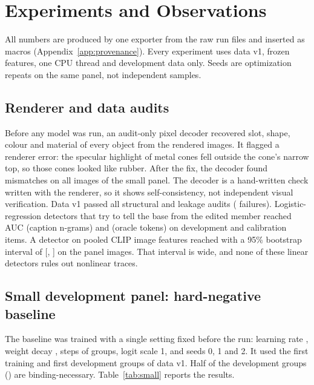 \section{Experiments and Observations}
\label{sec:experiments}

All numbers are produced by one exporter from the raw run files and inserted as macros
(Appendix~\ref{app:provenance}). Every experiment uses data v1, frozen features, one CPU thread and
development data only. Seeds are optimization repeats on the same panel, not independent samples.

\subsection{Renderer and data audits}
Before any model was run, an audit-only pixel decoder recovered slot, shape, colour and material of
every object from the rendered images. It flagged a renderer error: the specular highlight of metal
cones fell outside the cone's narrow top, so those cones looked like rubber. After the fix, the
decoder found \SPrenderMismatch{} mismatches on all \SPrenderImages{} images of the small panel.
The decoder is a hand-written check written with the renderer, so it shows self-consistency, not
independent visual verification. Data v1 passed all structural and leakage audits (\DVauditFail{}
failures). Logistic-regression detectors that try to tell the base from the edited member reached
AUC \DVblindText{} (caption n-grams) and \DVblindImage{} (oracle tokens) on \DVblindN{}
development and calibration items. A detector on pooled CLIP image features reached
\SPdetectAUC{} with a 95\% bootstrap interval of [\SPdetectLo, \SPdetectHi] on the \SPdetectN{} panel images.
That interval is wide, and none of these linear detectors rules out nonlinear traces.

\subsection{Small development panel: hard-negative baseline}
The baseline was trained with a single setting fixed before the run: learning rate \SPlr, weight
decay \SPwd, \SPsteps{} steps of \SPbatch{} groups, logit scale 1, and seeds 0, 1 and 2. It used the first
\SPtrainGroups{} training and first \SPdevGroups{} development groups of data v1. Half of the
development groups (\SPdevBNn) are binding-necessary. Table~\ref{tab:small} reports the results.

\begin{table}[t]
\caption{Small development panel (\SPtrainGroups{} training / \SPdevGroups{} development groups,
\SPdevBNn{} binding-necessary). Entries for trained heads list seeds 0/1/2, which are optimization
repeats on the same panel. \bn: binding-necessary subset; ``all'': all four edit kinds. Chance for
independent continuous scores: group $1/6$, GroupMatch $1/2$, pair AUC $0.5$. Single-modality rows
are zero or $0.5$ by construction (Section~\ref{sec:setting}). Source:
\url{runs/pixel_baseline_v1_20260926T161957Z/metrics.json}.}
\label{tab:small}
\centering\footnotesize

\end{table}

